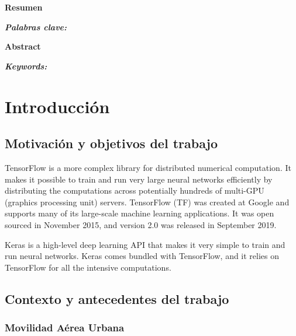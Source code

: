 \documentclass[12pt,a4paper]{book}
\begin{document}
 

\thispagestyle{empty}
\clearpage
\setcounter{page}{1}


\newpage
\begin{center}
   {\bf Resumen} 
\end{center}
   

\vspace{0.6 cm}
\textsl{\textbf{Palabras clave:} } 



\begin{center}
   {\bf Abstract} 
\end{center}



\vspace{0.6 cm}
\textsl{\textbf{Keywords:} } 


\newpage
\tableofcontents

\newpage
\clearpage
{}

\chapter{Introducción} \label{Capitulo 1}
      



\section{Motivación y objetivos del trabajo} \label{Sec:1_1}

TensorFlow is a more complex library for distributed numerical computation. It makes it possible to train and run very large neural networks efficiently by distributing the computations across potentially hundreds of multi-GPU (graphics processing unit) servers. TensorFlow (TF) was created at Google and supports many of its large-scale machine learning applications. It was open sourced in November 2015, and version 2.0 was released in September 2019.

Keras is a high-level deep learning API that makes it very simple to train and run neural networks. Keras comes bundled with TensorFlow, and it relies on TensorFlow for all the intensive computations.

    
\section{Contexto y antecedentes del trabajo} \label{Sec:1_2}

\subsection{Movilidad Aérea Urbana} \label{Subsubsec: 1_2_1}
  
\end{document}
